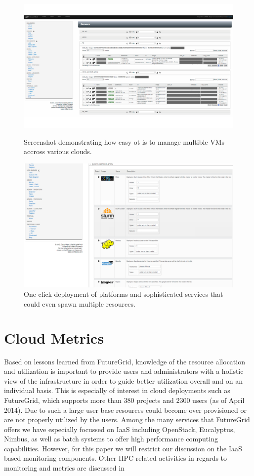 \documentclass{tex/sig-alternate}
\begin{document}
{\begin{figure}[htb]
  \centering
    \includegraphics[width=1.0\columnwidth]{images/instances.pdf}
  \caption{Screenshot demonstrating how easy ot is to manage multible VMs accross various clouds.}\label{F:instances}
  \centering
    \includegraphics[width=1.0\columnwidth]{images/oneclick.pdf}
  \caption{One click deployment of platforms and sophisticated
    services that could even spawn multiple resources.}\label{F:oneclick}
\end{figure}

\section{Cloud Metrics}

Based on lessons learned from FutureGrid, knowledge of the resource
allocation and utilization is important to provide users and
administrators with a holistic view of the infrastructure in order to
guide better utilization overall and on an individual basis. This is
especially of interest in cloud deployments such as FutureGrid, which
supports more than 380 projects and 2300 users (as of April 2014). Due
to such a large user base resources could become over provisioned or
are not properly utilized by the users. Among the many services that
FutureGrid offers we have especially focussed on IaaS including
OpenStack, Eucalyptus, Nimbus, as well as batch systems to offer high
performance computing capabilities.  However, for this paper we will
restrict our discussion on the IaaS based monitoring components.
Other HPC related activities in regards to monitoring and metrics are
discussed in
\cite{ubmod,las12xdmod-kernel,las12xdmod-planing,las13xdmod,smith13info}

}
\end{document}

